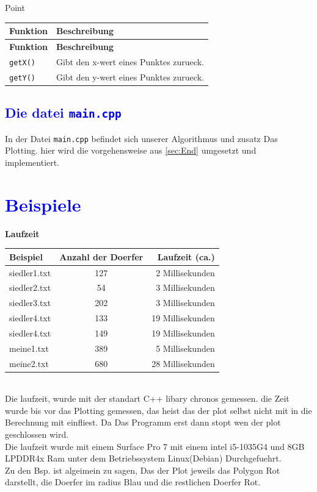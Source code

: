\documentclass{article}
\begin{document}
\par\medskip
\begin{center}\Large{ Point}\end{center}
\begin{longtable}{|>{\raggedright\arraybackslash}p{3.5cm}|p{11.5cm}|}
\hline
\textbf{Funktion} & \textbf{Beschreibung} \\
\hline
\endfirsthead
\hline
\textbf{Funktion} & \textbf{Beschreibung} \\
\hline
\endhead
\texttt{getX()} & Gibt den x-wert eines Punktes zurueck.
\\
\hline
\texttt{getY()} & Gibt den y-wert eines Punktes zurueck.
\\
\hline
\end{longtable}
\subsection{\textcolor{blue}{Die datei \texttt{main.cpp}}}
In der Datei \texttt{main.cpp} befindet sich unserer Algorithmus und zusatz Das Plotting.
hier wird die vorgehensweise aus \ref{sec:End} umgesetzt und implementiert.
\section{\textcolor{blue}{Beispiele}}
\Large{\textbf{Laufzeit}} 
\\
\vspace{5pt}
\begin{tabular}{|l|c|r|}
\hline
Beispiel & Anzahl der Doerfer & Laufzeit (ca.) \\
\hline
siedler1.txt & 127 & 2 Millisekunden\\
siedler2.txt & 54 & 3 Millisekunden \\
siedler3.txt & 202 & 3 Millisekunden \\
siedler4.txt & 133 & 19 Millisekunden \\
siedler4.txt & 149 & 19 Millisekunden\\
meine1.txt & 389 & 5 Millisekunden\\
meine2.txt & 680 & 28 Millisekunden \\
\hline
\end{tabular}
\vspace{5pt}
\\
Die laufzeit, wurde mit der standart C++ libary chronos gemessen. die Zeit wurde bis vor das Plotting gemessen, das heist das der plot selbst nicht mit in die Berechnung mit einfliest. Da Das Programm erst dann stopt wen der plot geschlossen wird.
\\
Die laufzeit wurde mit einem Surface Pro 7 mit einem intel i5-1035G4 und 8GB LPDDR4x Ram unter dem Betriebssystem Linux(Debian) Durchgefuehrt.
\\
Zu den Bsp. ist algeimein zu sagen, Das der Plot jeweils das Polygon Rot darstellt, die Doerfer im radius Blau und die restlichen Doerfer Rot.
\end{document}
